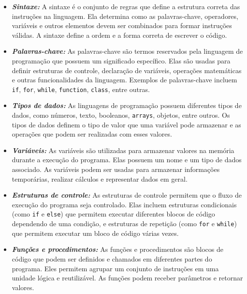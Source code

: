 \documentclass[a4paper, 12pt, onecolumn,singlespacing]{article}
\begin{document}
	\begin{itemize}
		\item \textbf{\textit{Sintaxe:}} A sintaxe é o conjunto de regras que define a estrutura correta das instruções na linguagem. Ela determina como as palavras-chave, operadores, variáveis e outros elementos devem ser combinados para formar instruções válidas. A sintaxe define a ordem e a forma correta de escrever o código.
		
		\item \textbf{\textit{Palavras-chave:}} As palavras-chave são termos reservados pela linguagem de programação que possuem um significado específico. Elas são usadas para definir estruturas de controle, declaração de variáveis, operações matemáticas e outras funcionalidades da linguagem. Exemplos de palavras-chave incluem \texttt{if}, \texttt{for}, \texttt{while}, \texttt{function}, \texttt{class}, entre outras.
		
		\item \textbf{\textit{Tipos de dados:}} As linguagens de programação possuem diferentes tipos de dados, como números, texto, booleanos, \texttt{arrays}, objetos, entre outros. Os tipos de dados definem o tipo de valor que uma variável pode armazenar e as operações que podem ser realizadas com esses valores.
		
		\item \textbf{\textit{Variáveis:}} As variáveis são utilizadas para armazenar valores na memória durante a execução do programa. Elas possuem um nome e um tipo de dados associado. As variáveis podem ser usadas para armazenar informações temporárias, realizar cálculos e representar dados em geral.
		
		\item \textbf{\textit{Estruturas de controle:}} As estruturas de controle permitem que o fluxo de execução do programa seja controlado. Elas incluem estruturas condicionais (como \texttt{if} e \texttt{else}) que permitem executar diferentes blocos de código dependendo de uma condição, e estruturas de repetição (como \texttt{for} e \texttt{while}) que permitem executar um bloco de código várias vezes.
		
		\item \textbf{\textit{Funções e procedimentos:}} As funções e procedimentos são blocos de código que podem ser definidos e chamados em diferentes partes do programa. Eles permitem agrupar um conjunto de instruções em uma unidade lógica e reutilizável. As funções podem receber parâmetros e retornar valores.
		

\end{itemize}
\end{document}
